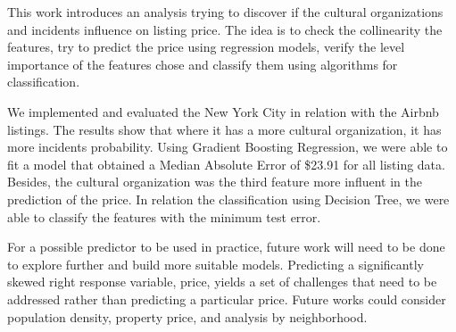 \documentclass[sigconf]{acmart}
\begin{document}
This work introduces an analysis trying to discover if the cultural organizations and incidents influence on listing price. The idea is to check the collinearity the features, try to predict the price using regression models, verify the level importance of the features chose and classify them using algorithms for classification. 

We implemented and evaluated the New York City in relation with the Airbnb listings. The results show that where it has a more cultural organization, it has more incidents probability. Using Gradient Boosting Regression, we were able to fit a model that obtained a Median Absolute Error of \$23.91 for all listing data. Besides, the cultural organization was the third feature more influent in the prediction of the price. In relation the classification using Decision Tree, we were able to classify the features with the minimum test error.

For a possible predictor to be used in practice, future work will need to be done to explore further and build more suitable models. Predicting a significantly skewed right response variable, price, yields a set of challenges that need to be addressed rather than predicting a particular price. Future works could consider population density, property price, and analysis by neighborhood.

\balance

 
\end{document}
